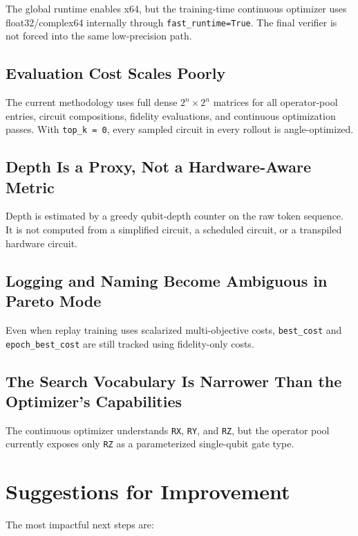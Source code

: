 \documentclass[11pt]{article}
\begin{document}
The global runtime enables x64, but the training-time continuous optimizer uses float32/complex64 internally through \texttt{fast\_runtime=True}. The final verifier is not forced into the same low-precision path.

\subsection{Evaluation Cost Scales Poorly}

The current methodology uses full dense $2^n \times 2^n$ matrices for all operator-pool entries, circuit compositions, fidelity evaluations, and continuous optimization passes. With \texttt{top\_k = 0}, every sampled circuit in every rollout is angle-optimized.

\subsection{Depth Is a Proxy, Not a Hardware-Aware Metric}

Depth is estimated by a greedy qubit-depth counter on the raw token sequence. It is not computed from a simplified circuit, a scheduled circuit, or a transpiled hardware circuit.

\subsection{Logging and Naming Become Ambiguous in Pareto Mode}

Even when replay training uses scalarized multi-objective costs, \texttt{best\_cost} and \texttt{epoch\_best\_cost} are still tracked using fidelity-only costs.

\subsection{The Search Vocabulary Is Narrower Than the Optimizer's Capabilities}

The continuous optimizer understands \texttt{RX}, \texttt{RY}, and \texttt{RZ}, but the operator pool currently exposes only \texttt{RZ} as a parameterized single-qubit gate type.

\section{Suggestions for Improvement}

The most impactful next steps are:
\end{document}
